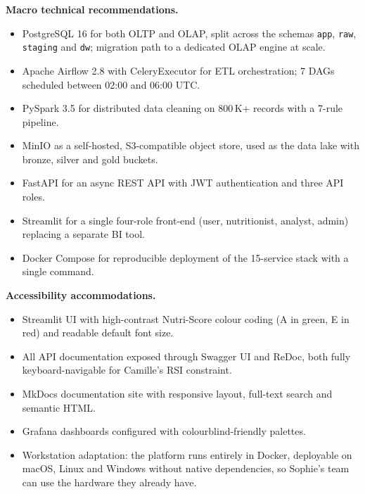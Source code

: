 \documentclass[a4paper,11pt,oneside,openany]{report}
\begin{document}
\textbf{Macro technical recommendations.}
\begin{itemize}[nosep]
  \item PostgreSQL 16 for both OLTP and OLAP, split across the
        schemas \texttt{app}, \texttt{raw}, \texttt{staging} and
        \texttt{dw}; migration path to a dedicated OLAP engine at
        scale.
  \item Apache Airflow 2.8 with CeleryExecutor for ETL
        orchestration; 7 DAGs scheduled between 02:00 and 06:00
        UTC.
  \item PySpark 3.5 for distributed data cleaning on 800\,K+
        records with a 7-rule pipeline.
  \item MinIO as a self-hosted, S3-compatible object store, used
        as the data lake with bronze, silver and gold buckets.
  \item FastAPI for an async REST API with JWT authentication and
        three API roles.
  \item Streamlit for a single four-role front-end (user,
        nutritionist, analyst, admin) replacing a separate BI
        tool.
  \item Docker Compose for reproducible deployment of the
        15-service stack with a single command.
\end{itemize}

\textbf{Accessibility accommodations.}
\begin{itemize}[nosep]
  \item Streamlit UI with high-contrast Nutri-Score colour coding
        (A in green, E in red) and readable default font size.
  \item All API documentation exposed through Swagger UI and
        ReDoc, both fully keyboard-navigable for Camille's RSI
        constraint.
  \item MkDocs documentation site with responsive layout,
        full-text search and semantic HTML.
  \item Grafana dashboards configured with colourblind-friendly
        palettes.
  \item Workstation adaptation: the platform runs entirely in
        Docker, deployable on macOS, Linux and Windows without
        native dependencies, so Sophie's team can use the hardware
        they already have.
\end{itemize}
\end{document}
